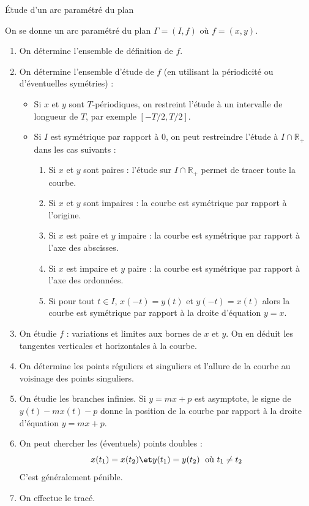 \documentclass[french,11pt,twoside]{VcCours}
\begin{document}
\begin{Methode}{Étude d'un arc paramétré du plan}
	
On se donne un arc paramétré du plan $\Gamma =(I,f)$ où $f=(x,y)$.

\begin{enumerate}
\item On détermine l'ensemble de définition de $f$.
\item On détermine l'ensemble d'étude de $f$ (en utilisant la périodicité ou d'éventuelles symétries) :
\begin{itemize}
\item Si $x$ et $y$ sont $T$-périodiques, on restreint l'étude à un intervalle de longueur de $T$, par exemple $[-T/2,T/2]$.
\item Si $I$ est symétrique par rapport à $0$, on peut restreindre l'étude à $I \cap \mathbb{R}_+$ dans les cas suivants :
\begin{enumerate}
\item Si $x$ et $y$ sont paires : l'étude sur $I \cap \mathbb{R}_+$ permet de tracer toute la courbe.
\item Si $x$ et $y$ sont impaires : la courbe est symétrique par rapport à l'origine.
\item Si $x$ est paire et $y$ impaire : la courbe est symétrique par rapport à l'axe des abscisses.
\item Si $x$ est impaire et $y$ paire : la courbe est symétrique par rapport à l'axe des ordonnées.
\item Si pour tout $t \in I$, $x(-t)=y(t)$ et $y(-t)=x(t)$ alors la courbe est symétrique par rapport à la droite d'équation $y=x$.
\end{enumerate}
\end{itemize}
\item On étudie $f$ : variations et limites aux bornes de $x$ et $y$. On en déduit les tangentes verticales et horizontales à la courbe.
\item On détermine les points réguliers et singuliers et l'allure de la courbe au voisinage des points singuliers.
\item On étudie les branches infinies. Si $y=mx+p$ est asymptote, le signe de $y(t)-mx(t)-p$ donne la position de la courbe par rapport à la droite d'équation $y=mx+p$.
\item On peut chercher les (éventuels) points doubles :
$$ x(t_1)=x(t_2) \et y(t_1)=y(t_2) \; \hbox{ où } t_1 \neq t_2$$
C'est généralement pénible.
\item On effectue le tracé.
\end{enumerate}
\end{Methode}
\end{document}
